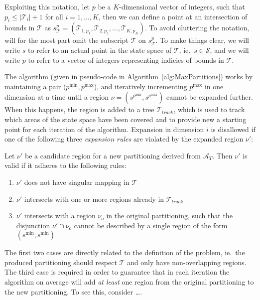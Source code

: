 Exploiting this notation, let $p$ be a $K$-dimensional vector of integers, such
that $p_i \leq |\mathcal{T}_i| + 1$ for all $i = 1,\ldots,K$, then we can define
a point at an intersection of bounds in $\mathcal{T}$ as $s^{p}_{\mathcal{T}} =
(\mathcal{T}_{1,p_1}, \mathcal{T}_{2,p_2}, \ldots, \mathcal{T}_{K,p_K})$. To
avoid cluttering the notation, will for the most part omit the subscript
$\mathcal{T}$ on $s^{p}_{\mathcal{T}}$. To make things clear, we will write $s$
to refer to an actual point in the state space of $\mathcal{T}$, ie.\ $s \in
\mathcal{S}$, and we will write $p$ to refer to a vector of integers
representing indicies of bounds in $\mathcal{T}$.

The algorithm (given in pseudo-code in Algorithm~\ref{alg:MaxPartitions}) works
by maintaining a pair $(p^{\min}, p^{\max}$), and iteratively incrementing
$p^{\max}$ in one dimension at a time until a region $\nu = (s^{p^{\min}},
s^{p^{\max}})$ cannot be expanded further. When this happens, the region is
added to a tree $\mathcal{T}_{track}$, which is used to track which areas of the
state space have been covered and to provide new a starting point for each
iteration of the algorithm. Expansion in dimension $i$ is disallowed if one of
the following three \textit{expansion rules} are violated by the expanded region
$\nu'$:

\begin{definition}\label{def:expansionRules}
    Let $\nu'$ be a candidate region for a new partitioning derived from
    $\mathcal{A}_{T}$. Then $\nu'$ is valid if it adheres to the following rules:

    \begin{enumerate}
        \item $\nu'$ does not have singular mapping in $\mathcal{T}$
        \item $\nu'$ intersects with one or more regions already in
            $\mathcal{T}_{track}$
        \item $\nu'$ intersects with a region $\nu_{o}$ in the original
            partitioning, such that the disjunction $\nu' \cap \nu_{o}$ cannot be
            described by a single region of the form $(s^{\min}, s^{\min})$
    \end{enumerate}
\end{definition}

\noindent The first two cases are directly related to the definition of the
problem, ie.\ the produced partitioning should respect $\mathcal{T}$ and only
have non-overlapping regions. The third case is required in order to guarantee
that in each iteration the algorithm on average will add \textit{at least} one
region from the original partitioning to the new partitioning. To see this,
consider \ldots{}.


